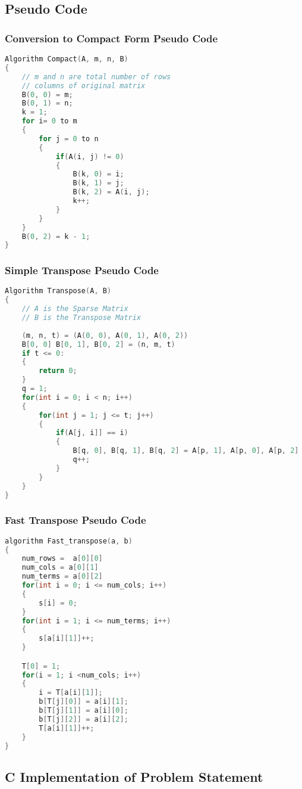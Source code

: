 \documentclass[11pt]{article}
\begin{document}
\subsection{Pseudo Code}
\subsubsection*{Conversion to Compact Form Pseudo Code}

\begin{lstlisting}[language=C]
Algorithm Compact(A, m, n, B)
{
	// m and n are total number of rows
	// columns of original matrix
	B(0, 0) = m;
	B(0, 1) = n;
	k = 1;
	for i= 0 to m
	{
		for j = 0 to n
		{
			if(A(i, j) != 0)
			{
				B(k, 0) = i;
				B(k, 1) = j;
				B(k, 2) = A(i, j);
				k++;
			}
		}
	}
	B(0, 2) = k - 1;
}
\end{lstlisting}
\subsubsection*{Simple Transpose Pseudo Code}

\begin{lstlisting}[language=C]
Algorithm Transpose(A, B)
{
	// A is the Sparse Matrix
	// B is the Transpose Matrix
	
	(m, n, t) = (A(0, 0), A(0, 1), A(0, 2))
	B[0, 0] B[0, 1], B[0, 2] = (n, m, t)
	if t <= 0:
	{
		return 0;
	}
	q = 1;
	for(int i = 0; i < n; i++)
	{
		for(int j = 1; j <= t; j++)
		{
			if(A[j, i]] == i)
			{
				B[q, 0], B[q, 1], B[q, 2] = A[p, 1], A[p, 0], A[p, 2]
				q++;
			}
		}
	}
}
\end{lstlisting}
\subsubsection*{Fast Transpose Pseudo Code}

\begin{lstlisting}[language=C]
algorithm Fast_transpose(a, b)
{
	num_rows =  a[0][0]
	num_cols = a[0][1]
	num_terms = a[0][2]
	for(int i = 0; i <= num_cols; i++)
	{
		s[i] = 0;
	}	
	for(int i = 1; i <= num_terms; i++)
	{
		s[a[i][1]]++;
	}

	T[0] = 1;
	for(i = 1; i <num_cols; i++)
	{
		i = T[a[i][1]];
		b[T[j][0]] = a[i][1];
		b[T[j][1]] = a[i][0];
		b[T[j][2]] = a[i][2];
		T[a[i][1]]++;	
	}
}
\end{lstlisting}

\subsection{C Implementation of Problem Statement}
\end{document}
